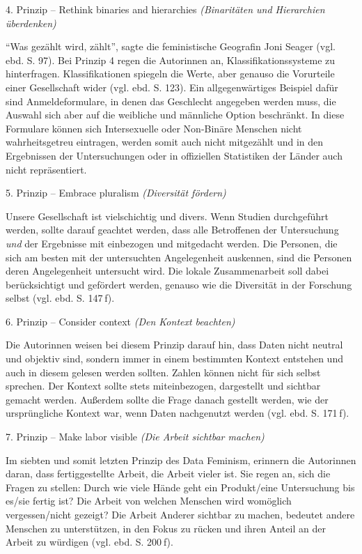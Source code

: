 \documentclass[a4paper,
fontsize=11pt,
oneside,
numbers=noperiodatend,
parskip=half-,
bibliography=totoc,
final
]{scrartcl}
\begin{document}
4. Prinzip -- Rethink binaries and hierarchies \emph{(Binaritäten und
Hierarchien überdenken)}

\enquote{Was gezählt wird, zählt}, sagte die feministische Geografin
Joni Seager (vgl. ebd. S. 97). Bei Prinzip 4 regen die Autorinnen an,
Klassifikationssysteme zu hinterfragen. Klassifikationen spiegeln die
Werte, aber genauso die Vorurteile einer Gesellschaft wider (vgl. ebd.
S. 123). Ein allgegenwärtiges Beispiel dafür sind Anmeldeformulare, in
denen das Geschlecht angegeben werden muss, die Auswahl sich aber auf
die weibliche und männliche Option beschränkt. In diese Formulare können
sich Intersexuelle oder Non-Binäre Menschen nicht wahrheitsgetreu
eintragen, werden somit auch nicht mitgezählt und in den Ergebnissen der
Untersuchungen oder in offiziellen Statistiken der Länder auch nicht
repräsentiert.

5. Prinzip -- Embrace pluralism \emph{(Diversität fördern)}

Unsere Gesellschaft ist vielschichtig und divers. Wenn Studien
durchgeführt werden, sollte darauf geachtet werden, dass alle
Betroffenen der Untersuchung \emph{und} der Ergebnisse mit einbezogen
und mitgedacht werden. Die Personen, die sich am besten mit der
untersuchten Angelegenheit auskennen, sind die Personen deren
Angelegenheit untersucht wird. Die lokale Zusammenarbeit soll dabei
berücksichtigt und gefördert werden, genauso wie die Diversität in der
Forschung selbst (vgl. ebd. S. 147 f).

6. Prinzip -- Consider context \emph{(Den Kontext beachten)}

Die Autorinnen weisen bei diesem Prinzip darauf hin, dass Daten nicht
neutral und objektiv sind, sondern immer in einem bestimmten Kontext
entstehen und auch in diesem gelesen werden sollten. Zahlen können nicht
für sich selbst sprechen. Der Kontext sollte stets miteinbezogen,
dargestellt und sichtbar gemacht werden. Außerdem sollte die Frage
danach gestellt werden, wie der ursprüngliche Kontext war, wenn Daten
nachgenutzt werden (vgl. ebd. S. 171 f).

7. Prinzip -- Make labor visible \emph{(Die Arbeit sichtbar machen)}

Im siebten und somit letzten Prinzip des Data Feminism, erinnern die
Autorinnen daran, dass fertiggestellte Arbeit, die Arbeit vieler ist.
Sie regen an, sich die Fragen zu stellen: Durch wie viele Hände geht ein
Produkt/eine Untersuchung bis es/sie fertig ist? Die Arbeit von welchen
Menschen wird womöglich vergessen/nicht gezeigt? Die Arbeit Anderer
sichtbar zu machen, bedeutet andere Menschen zu unterstützen, in den
Fokus zu rücken und ihren Anteil an der Arbeit zu würdigen (vgl. ebd. S.
200 f).
\end{document}
